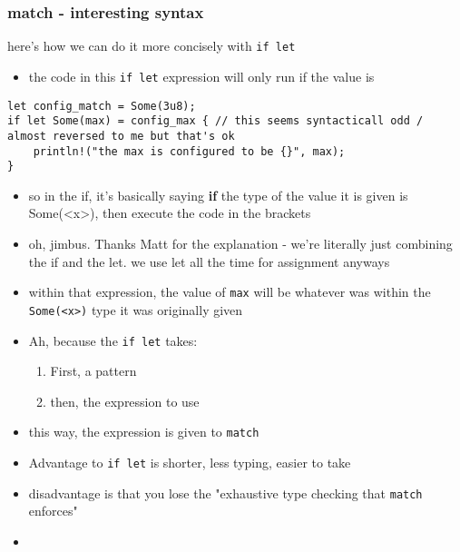 \documentclass[11pt]{article}
\begin{document}
\subsubsection{match - interesting syntax}
\label{sec:org88db0fc}
here's how we can do it more concisely with \texttt{if let}
\begin{itemize}
\item the code in this \texttt{if let} expression will only run if the value is
\end{itemize}
\begin{verbatim}
let config_match = Some(3u8);
if let Some(max) = config_max { // this seems syntacticall odd / almost reversed to me but that's ok
    println!("the max is configured to be {}", max);
}

\end{verbatim}
\begin{itemize}
\item so in the if, it's basically saying \textbf{if} the type of the value it is given is Some(<x>), then execute the code in the brackets
\item oh, jimbus. Thanks Matt for the explanation - we're literally just combining the if and the let. we use let all the time for assignment anyways
\item within that expression, the value of \texttt{max} will be whatever was within the \texttt{Some(<x>)} type it was originally given
\item Ah, because the \texttt{if let} takes:
\begin{enumerate}
\item First, a pattern
\item then, the expression to use
\end{enumerate}
\item this way, the expression is given to \texttt{match}

\item Advantage to \texttt{if let} is shorter, less typing, easier to take

\item disadvantage is that you lose the "exhaustive type checking that \texttt{match} enforces"

\item 
\end{itemize}
\end{document}
